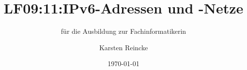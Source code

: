 \documentclass[]{beamer}
\title{LF09:11:IPv6-Adressen und -Netze}
\subtitle{für die Ausbildung zur Fachinformatikerin}
\institute{GS-LDK}
\author{Karsten Reincke}
\date{\today}
\def\cfgGl{../../../cfg.gl/}
\begin{document}

\begin{frame}
  \titlepage
\end{frame}






\logo{}
\newpage



%
\end{document}
